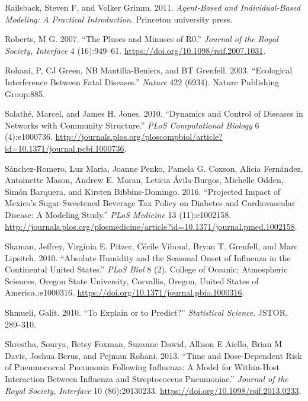 \documentclass[]{book}
\theoremstyle{definition}
\theoremstyle{definition}
\theoremstyle{definition}
\theoremstyle{remark}
\begin{document}
\leavevmode\hypertarget{ref-railsback11}{}%
Railsback, Steven F, and Volker Grimm. 2011. \emph{Agent-Based and
Individual-Based Modeling: A Practical Introduction}. Princeton
university press.

\leavevmode\hypertarget{ref-roberts07}{}%
Roberts, M G. 2007. ``The Pluses and Minuses of R0.'' \emph{Journal of
the Royal Society, Interface} 4 (16):949--61.
\url{https://doi.org/10.1098/rsif.2007.1031}.

\leavevmode\hypertarget{ref-rohani03}{}%
Rohani, P, CJ Green, NB Mantilla-Beniers, and BT Grenfell. 2003.
``Ecological Interference Between Fatal Diseases.'' \emph{Nature} 422
(6934). Nature Publishing Group:885.

\leavevmode\hypertarget{ref-salathe10}{}%
Salathé, Marcel, and James H. Jones. 2010. ``Dynamics and Control of
Diseases in Networks with Community Structure.'' \emph{PLoS
Computational Biology} 6 (4):e1000736.
\url{http://journals.plos.org/ploscompbiol/article?id=10.1371/journal.pcbi.1000736}.

\leavevmode\hypertarget{ref-sanchez-romero16}{}%
Sánchez-Romero, Luz Maria, Joanne Penko, Pamela G. Coxson, Alicia
Fernández, Antoinette Mason, Andrew E. Moran, Leticia Ávila-Burgos,
Michelle Odden, Simón Barquera, and Kirsten Bibbins-Domingo. 2016.
``Projected Impact of Mexico's Sugar-Sweetened Beverage Tax Policy on
Diabetes and Cardiovascular Disease: A Modeling Study.'' \emph{PLoS
Medicine} 13 (11):e1002158.
\url{http://journals.plos.org/plosmedicine/article?id=10.1371/journal.pmed.1002158}.

\leavevmode\hypertarget{ref-shaman10}{}%
Shaman, Jeffrey, Virginia E. Pitzer, Cécile Viboud, Bryan T. Grenfell,
and Marc Lipsitch. 2010. ``Absolute Humidity and the Seasonal Onset of
Influenza in the Continental United States.'' \emph{PLoS Biol} 8 (2).
College of Oceanic; Atmospheric Sciences, Oregon State University,
Corvallis, Oregon, United States of America.:e1000316.
\url{https://doi.org/10.1371/journal.pbio.1000316}.

\leavevmode\hypertarget{ref-shmueli10}{}%
Shmueli, Galit. 2010. ``To Explain or to Predict?'' \emph{Statistical
Science}. JSTOR, 289--310.

\leavevmode\hypertarget{ref-shrestha13}{}%
Shrestha, Sourya, Betsy Foxman, Suzanne Dawid, Allison E Aiello, Brian M
Davis, Joshua Berus, and Pejman Rohani. 2013. ``Time and Dose-Dependent
Risk of Pneumococcal Pneumonia Following Influenza: A Model for
Within-Host Interaction Between Influenza and Streptococcus
Pneumoniae.'' \emph{Journal of the Royal Society, Interface} 10
(86):20130233. \url{https://doi.org/10.1098/rsif.2013.0233}.
\end{document}
